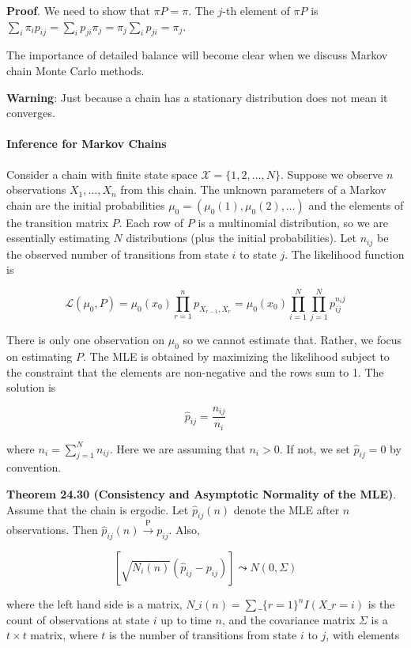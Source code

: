 \textbf{Proof}. We need to show that \(\pi P = \pi\). The \(j\)-th
element of \(\pi P\) is
\(\sum_{i} \pi_{i} p_{ij} = \sum_{i} p_{ji}\pi_{j} = \pi_{j} \sum_{i} p_{ji} = \pi_{j}\).

The importance of detailed balance will become clear when we discuss
Markov chain Monte Carlo methods.

\textbf{Warning}: Just because a chain has a stationary distribution
does not mean it converges.

\paragraph{Inference for Markov Chains}\label{inference-for-markov-chains}

Consider a chain with finite state space $\mathcal{X} = \{ 1, 2, \dots,
N \} $. Suppose we observe \(n\) observations \(X_{1}, \dots, X_{n}\) from
this chain. The unknown parameters of a Markov chain are the initial
probabilities \(\mu_{0} = (\mu_{0}(1), \mu_{0}(2), \dots)\) and the elements
of the transition matrix \(P\). Each row of \(P\) is a multinomial
distribution, so we are essentially estimating \(N\) distributions (plus
the initial probabilities). Let \(n_{ij}\) be the observed number of
transitions from state \(i\) to state \(j\). The likelihood function is

\[ \mathcal{L}(\mu_{0}, P) = \mu_{0}(x_{0}) \prod_{r=1}^{n} p_{X_{r - 1}, X_r} = \mu_{0}(x_{0}) \prod_{i=1}^N \prod_{j=1}^N p_{ij}^{n_{i}j} \]

There is only one observation on \(\mu_{0}\) so we cannot estimate that.
Rather, we focus on estimating \(P\). The MLE is obtained by maximizing
the likelihood subject to the constraint that the elements are
non-negative and the rows sum to 1. The solution is

\[ \hat{p}_{ij} = \frac{n_{ij}}{n_{i}} \]

where \(n_{i} = \sum_{j=1}^N n_{ij}\). Here we are assuming that
\(n_{i} > 0\). If not, we set \(\hat{p}_{ij} = 0\) by convention.

\textbf{Theorem 24.30 (Consistency and Asymptotic Normality of the
MLE)}. Assume that the chain is ergodic. Let \(\hat{p}_{ij}(n)\) denote
the MLE after \(n\) observations. Then
\(\hat{p}_{ij}(n) \xrightarrow{\text{P}} p_{ij}\). Also,

\[ \left[ \sqrt{N_{i}(n)} (\hat{p}_{ij} - p_{ij})  \right] \leadsto N(0, \Sigma) \]

where the left hand side is a matrix, $ N\_{i}(n) = \sum\_\{r=1\}^{n}
I(X\_r = i)$ is the count of observations at state \(i\) up to time
\(n\), and the covariance matrix \(\Sigma\) is a \(t \times t\) matrix,
where \(t\) is the number of transitions from state \(i\) to \(j\), with
elements


